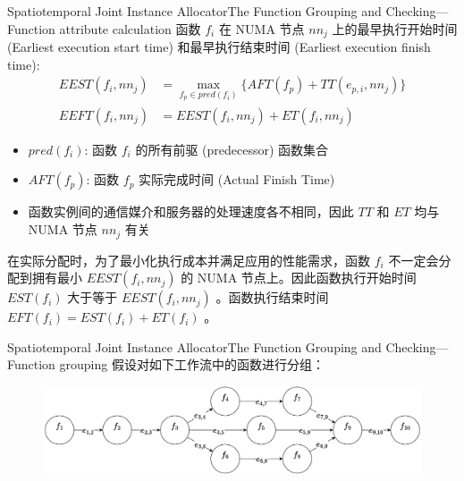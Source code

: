 \documentclass[aspectratio=169]{beamer}
\begin{document}
\begin{frame}{Spatiotemporal Joint Instance Allocator}{The Function Grouping and Checking---Function attribute calculation}
  函数 $f_i$ 在 NUMA 节点 $nn_j$ 上的最早执行开始时间 (Earliest execution start time) 和最早执行结束时间 (Earliest execution finish time):
  \begin{align*}
    EEST(f_i, nn_j) &= \max_{f_p \in pred(f_i)} \{AFT(f_p) + TT(e_{p,i}, nn_j)\} \\
    EEFT(f_i, nn_j) &= EEST(f_i, nn_j) + ET(f_i, nn_j)
  \end{align*}
  \begin{itemize}
    \item $pred(f_i)$: 函数 $f_i$ 的所有前驱 (predecessor) 函数集合
    \item $AFT(f_p)$: 函数 $f_p$ 实际完成时间 (Actual Finish Time)
    \item 函数实例间的通信媒介和服务器的处理速度各不相同，因此 $TT$ 和 $ET$ 均与 NUMA 节点 $nn_j$ 有关
  \end{itemize}
  在实际分配时，为了最小化执行成本并满足应用的性能需求，函数 $f_i$ 不一定会分配到拥有最小 $EEST(f_i, nn_j)$ 的 NUMA 节点上。因此函数执行开始时间 $EST(f_i)$ 大于等于 $EEST(f_i, nn_j)$ 。函数执行结束时间 $EFT(f_i) = EST(f_i) + ET(f_i)$ 。
\end{frame}

\begin{frame}{Spatiotemporal Joint Instance Allocator}{The Function Grouping and Checking---Function grouping}
  假设对如下工作流中的函数进行分组：
  \begin{figure}
    \centering
    \includegraphics[width=\textwidth]{img/method/function-grouping-1.pdf}
  \end{figure}
\end{frame}
\end{document}
